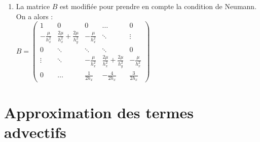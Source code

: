 \documentclass[12pt,a4paper]{article}
\begin{document}
\begin{enumerate}[resume]
    \item La matrice $B$ est modifiée pour prendre en compte la condition de Neumann. On a alors : \\
    $B = \begin{pmatrix}
        1 & 0 & 0 & \dots & 0 \\
        -\frac{\mu}{h_x^2} & \frac{2\mu}{h_x^2} + \frac{2\mu}{h_y^2} & -\frac{\mu}{h_x^2} & \ddots & \vdots \\
        0 & \ddots & \ddots & \ddots & 0 \\
        \vdots & \ddots & -\frac{\mu}{h_x^2} & \frac{2\mu}{h_x^2} + \frac{2\mu}{h_y^2} & -\frac{\mu}{h_x^2} \\
        0 & \dots & \frac{1}{2h_x} & -\frac{4}{2h_x} & \frac{3}{2h_x}
    \end{pmatrix}$\\

\end{enumerate}

\section*{Approximation des termes advectifs}
\end{document}
